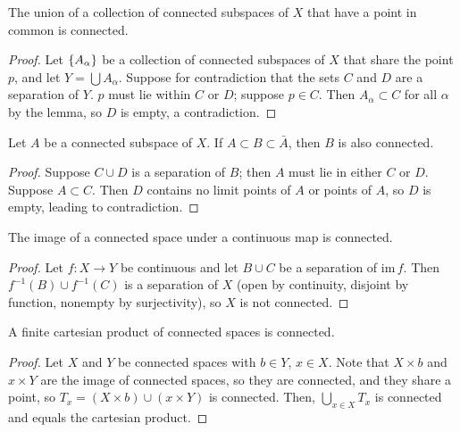 \documentclass[10pt]{report}
\begin{document}
\begin{theorem}
  The union of a collection of connected subspaces of $X$ that have a point in common is connected.
\end{theorem}
\begin{proof}
  Let $\left\{ A_\alpha \right\}$ be a collection of connected subspaces of $X$ that share the point $p$, and let $Y = \bigcup A_\alpha$.
  Suppose for contradiction that the sets $C$ and $D$ are a separation of $Y$.
  $p$ must lie within $C$ or $D$; suppose $p \in C$.
  Then $A_\alpha \subset C$ for all $\alpha$ by the lemma, so $D$ is empty, a contradiction.
\end{proof}

\begin{theorem}
  Let $A$ be a connected subspace of $X$.
  If $A \subset B \subset \bar A$, then $B$ is also connected.
\end{theorem}
\begin{proof}
  Suppose $C \cup D$ is a separation of $B$; then $A$ must lie in either $C$ or $D$.
  Suppose $A \subset C$.
  Then $D$ contains no limit points of $A$ or points of $A$, so $D$ is empty, leading to contradiction.
\end{proof}

\begin{theorem}
  The image of a connected space under a continuous map is connected.
\end{theorem}
\begin{proof}
  Let $f:X \rightarrow Y$ be continuous and let $B \cup C$ be a separation of $\text{im}\, f$.
  Then $f^{-1}(B) \cup f^{-1}(C)$ is a separation of $X$ (open by continuity, disjoint by function, nonempty by surjectivity), so $X$ is not connected.
\end{proof}

\begin{theorem}
  A finite cartesian product of connected spaces is connected.
\end{theorem}
\begin{proof}
  Let $X$ and $Y$ be connected spaces with $b \in Y$, $x \in X$.
  Note that $X \times b$ and $x \times Y$ are the image of connected spaces, so they are connected, and they share a point, so $T_x = (X \times b) \cup (x \times Y)$ is connected.
  Then, $\bigcup_{x \in X} T_x$ is connected and equals the cartesian product.
\end{proof}
\end{document}
